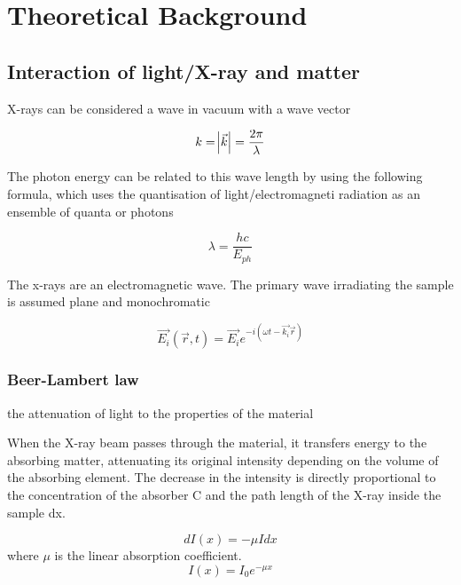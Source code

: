 \chapter{Theoretical Background}
\label{chap:theory_SAXS}

\section{Interaction of light/X-ray and matter}

X-rays can be considered a wave in vacuum with a wave vector 

\begin{equation}
        k=\abs{\vec{k}} = \frac{2\pi}{\lambda}
\end{equation}

The photon energy can be related to this wave length by using the following formula, which uses the quantisation of light/electromagneti radiation as an ensemble of quanta or photons

\begin{equation}
        \lambda = \frac{h c}{E_{ph}}
\end{equation}

The x-rays are an electromagnetic wave. The primary wave irradiating the sample is assumed plane and monochromatic

\begin{equation}
        \vec{E_i}\left( \vec{r},t \right)=\vec{E_i}e^{-i\left( \omega t - \vec{k_i}\vec{r} \right)}
\end{equation}

\subsection{Beer-Lambert law}
\label{sec:BeerLambert}

the attenuation of light to the properties of the material 

When the X-ray beam passes through the material, it transfers energy to the absorbing matter, attenuating its original intensity depending on the volume of the absorbing element. The decrease in the intensity is directly proportional to the concentration of the absorber C and the path length of the X-ray inside the sample dx.

\begin{equation}
        dI\left( x \right)=-\mu I dx
\end{equation}
where $\mu$ is the linear absorption coefficient.
\begin{equation}
        I\left( x \right)=I_0e^{-\mu x}
\end{equation}

